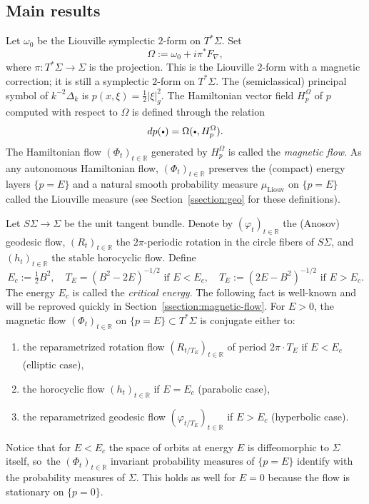\documentclass[JEP,XML,SOM,Unicode,published]{cedram}
\newcommand{\sbullet}{{\scriptscriptstyle\bullet}}
\newcommand{\csbullet}{{\raisebox{1pt}{$\sbullet$}}}
\theoremstyle{plain}
\theoremstyle{definition}
\newcommand{\R}{\mathbb{R}}
\let\Si\Sigma
\begin{document}
\subsection{Main results}

Let $\omega_0$ be the Liouville symplectic $2$-form on $T^*\Sigma$. Set
\[
\Omega := \omega_0 + i \pi^* F_\nabla,
\]
where $\pi : T^*\Sigma \to \Sigma$ is the projection. This is the Liouville $2$-form with a magnetic correction; it is still a symplectic $2$-form on $T^*\Sigma$. The (semiclassical) principal symbol of $k^{-2}\Delta_k$ is $p(x,\xi) = \tfrac{1}{2}|\xi|^2_g$. The Hamiltonian vector field $H_p^\Omega$ of $p$ computed with respect to $\Omega$ is defined through the relation
\[
dp(\csbullet) = \Omega(\csbullet, H^{\Omega}_p).
\]
The Hamiltonian flow $(\Phi_t)_{t \in \R}$ generated by $H_p^{\Omega}$ is called the \emph{magnetic flow}. As any autonomous Hamiltonian flow, $(\Phi_t)_{t \in \R}$ preserves the (compact) energy layers $\{p=E\}$ and a natural smooth probability measure $\mu_{\mathrm{Liouv}}$ on $\{p=E\}$ called the Liouville measure (see Section~\ref{ssection:geo} for these definitions).

Let $S\Sigma \to \Sigma$ be the unit tangent bundle. Denote by $(\varphi_t)_{t \in \R}$ the (Anosov) geodesic flow, $(R_t)_{t \in \R}$ the $2\pi$-periodic rotation in the circle fibers of $S\Sigma$, and $(h_t)_{t \in \R}$ the stable horocyclic flow. Define
\[
E_c := \tfrac{1}{2}B^2, \quad T_E = (B^2-2E)^{-1/2} \text{ if } E < E_c, \quad T_E := (2E-B^2)^{-1/2} \text{ if } E > E_c.
\]
The energy $E_c$ is called the \emph{critical energy}. The following fact is
well-known \cite{Arnold-61,Ginzburg-96} and will be reproved quickly in
Section~\ref{ssection:magnetic-flow}. For $E > 0$, the magnetic flow $(\Phi_t)_{t \in \R}$ on $\{p=E\}
\subset T^*\Sigma$ is conjugate either to:
\begin{enumerate}

\item the reparametrized rotation flow $(R_{t/T_E})_{t \in \R}$ of period
$2\pi \cdot T_E$ if $E < E_c$ (elliptic case),

\item the horocyclic flow $(h_t)_{t \in \R}$ if $E=E_c$ (parabolic case),

\item the reparametrized geodesic flow $(\varphi_{t/T_E})_{t \in \R}$ if $E>E_c$ (hyperbolic case).
\end{enumerate}
Notice that for $E < E_c$ the space of orbits at energy $E$ is diffeomorphic to $\Si$ itself, so~the $(\Phi_t)_{t \in \R}$ invariant probability measures of $\{ p = E\}$
identify with the probability measures of $\Si$. This holds as well for
$E=0$ because the flow is stationary on $\{ p =0 \}$.
\end{document}
